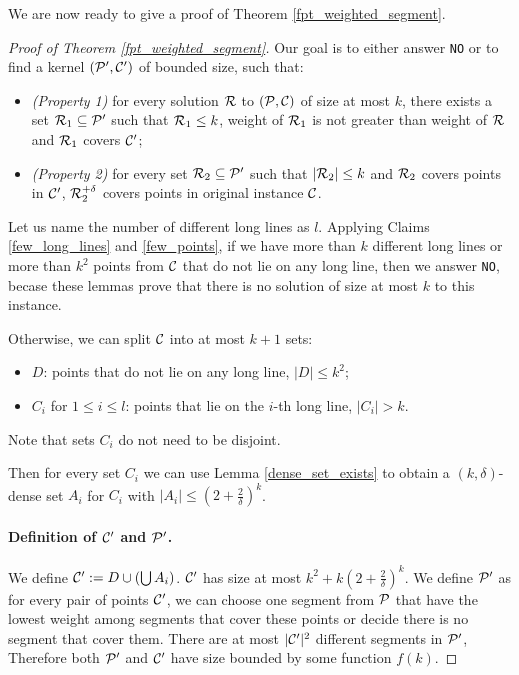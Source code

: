 We are now ready to give a proof of Theorem \ref{fpt_weighted_segment}.

\begin{proof}[Proof of Theorem \ref{fpt_weighted_segment}]
Our goal is to either answer \texttt{NO} or to find a kernel
$(\mathcal{P}', \mathcal{C}')$ of bounded size, such that:
\begin{itemize}
\item \textit{(Property 1)} for every solution
$\mathcal{R}$ to $(\mathcal{P}, \mathcal{C})$ of size at most $k$,
there exists a set $\mathcal{R}_1 \subseteq \mathcal{P}'$ such that
$\mathcal{R}_1 \le k$, weight of $\mathcal{R}_1$ is not greater than weight of $\mathcal{R}$
and $\mathcal{R}_1$ covers $\mathcal{C}'$;
\item \textit{(Property 2)}
for every set $\mathcal{R}_2 \subseteq \mathcal{P}'$ such that $|\mathcal{R}_2| \le k$
and $\mathcal{R}_2$ covers points in $\mathcal{C}'$, $\mathcal{R}_2^{+\delta}$
covers points in original instance $\mathcal{C}$.
\end{itemize}

Let us name the number of different long lines as $l$.
Applying Claims \ref{few_long_lines} and \ref{few_points},
if we have more than $k$ different long lines
or more than $k^2$ points from $\mathcal{C}$
that do not lie on any long line, then we answer \texttt{NO},
becase these lemmas prove that there is no solution of size at most $k$
to this instance.

Otherwise, we can split $\mathcal{C}$ into at most $k+1$ sets:
\begin{itemize}
\item $D$: points that do not lie on any long line, $|D| \le k^2$;
\item $C_i$ for $1 \le i \le l$: points that lie on the $i$-th long line, $|C_i| > k$.
\end{itemize}
Note that sets $C_i$ do not need to be disjoint.

Then for every set $C_i$ we can use Lemma \ref{dense_set_exists}
to obtain a $(k,\delta)$-dense set $A_i$
for $C_i$ with $|A_i| \le (2+\frac{2}{\delta})^k$.

\paragraph{Definition of $\mathcal{C}'$ and $\mathcal{P}'$.}
We define $\mathcal{C}':= D \cup (\bigcup A_i)$. $\mathcal{C}'$ has size at most
$k^2 + k(2+\frac{2}{\delta})^k$.
We define $\mathcal{P}'$ as
for every pair of points $\mathcal{C}'$, we can choose one segment from
$\mathcal{P}$ that have the lowest weight
among segments that cover these points 
or decide there is no segment that cover them.
There are at most $|\mathcal{C}'|^2$ different segments in $\mathcal{P}'$,
Therefore both $\mathcal{P}'$ and $\mathcal{C}'$ have size bounded
by some function $f(k)$.


\end{proof}
